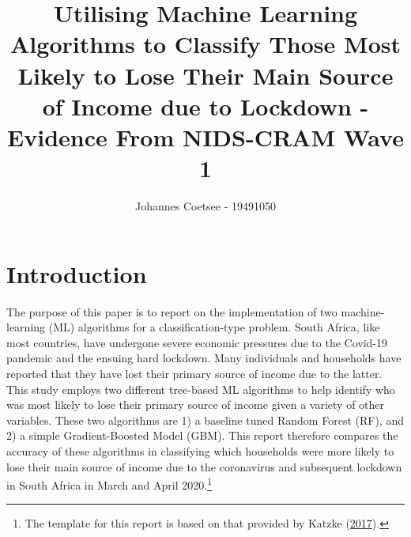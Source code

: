 \documentclass[11pt,preprint, authoryear]{elsarticle}
\numberwithin{equation}{section}
\numberwithin{figure}{section}
\numberwithin{table}{section}
\let\rmarkdownfootnote\footnote%
\def\footnote{\protect\rmarkdownfootnote}
\begin{document}
\begin{frontmatter}  %

\title{Utilising Machine Learning Algorithms to Classify Those Most Likely to
Lose Their Main Source of Income due to Lockdown - Evidence From
NIDS-CRAM Wave 1}





\author[Add1]{Johannes Coetsee - 19491050}





\address[Add1]{Stellenbosch University}



\vspace{1cm}

\vspace{0.5cm}
\end{frontmatter}



\pagestyle{fancy}
\chead{}
\lfoot{}
\lhead{}
\cfoot{}


\headsep 35pt %




\hypertarget{introduction}{%
\section{\texorpdfstring{Introduction
\label{Introduction}}{Introduction }}\label{introduction}}

The purpose of this paper is to report on the implementation of two
machine-learning (ML) algorithms for a classification-type problem.
South Africa, like most countries, have undergone severe economic
pressures due to the Covid-19 pandemic and the ensuing hard lockdown.
Many individuals and households have reported that they have lost their
primary source of income due to the latter. This study employs two
different tree-based ML algorithms to help identify who was most likely
to lose their primary source of income given a variety of other
variables. These two algorithms are 1) a baseline tuned Random Forest
(RF), and 2) a simple Gradient-Boosted Model (GBM). This report
therefore compares the accuracy of these algorithms in classifying which
households were more likely to lose their main source of income due to
the coronavirus and subsequent lockdown in South Africa in March and
April 2020.\footnote{The template for this report is based on that
  provided by Katzke (\protect\hyperlink{ref-Texevier}{2017}).}
\end{document}
